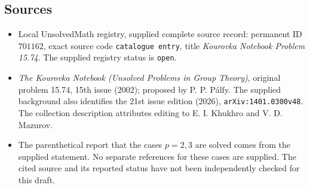 \documentclass[11pt]{article}
\begin{document}
\subsection{Sources}
\begin{itemize}
\item Local UnsolvedMath registry, supplied complete source record: permanent ID \(701162\), exact source code \texttt{catalogue entry}, title \emph{Kourovka Notebook Problem 15.74}. The supplied registry status is \texttt{open}.
\item \emph{The Kourovka Notebook (Unsolved Problems in Group Theory)}, original problem 15.74, 15th issue (2002); proposed by P. P. P\'alfy. The supplied background also identifies the 21st issue edition (2026), \texttt{arXiv:1401.0300v48}. The collection description attributes editing to E. I. Khukhro and V. D. Mazurov.
\item The parenthetical report that the cases \(p=2,3\) are solved comes from the supplied statement. No separate references for these cases are supplied. The cited source and its reported status have not been independently checked for this draft.
\end{itemize}
\end{document}
